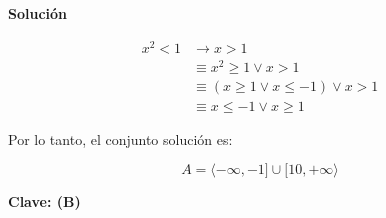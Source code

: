 \documentclass{article}
\begin{document}
\textbf{Solución}

\begin{align*}
x^2 < 1 &\longrightarrow x > 1 \\
&\equiv x^2 \geq 1 \lor x > 1 \\
&\equiv (x \geq 1 \lor x \leq -1) \lor x > 1 \\
&\equiv x \leq -1 \lor x \geq 1
\end{align*}

Por lo tanto, el conjunto solución es:

\[
A = \langle-\infty, -1] \cup [10, +\infty \rangle
\]

\textbf{Clave: (B)}
\end{document}

